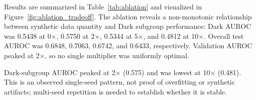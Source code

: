 Results are summarized in Table~\ref{tab:ablation} and visualized in Figure~\ref{fig:ablation_tradeoff}. The ablation reveals a non-monotonic relationship between synthetic data quantity and Dark subgroup performance: Dark AUROC was 0.5438 at 0$\times$, 0.5750 at 2$\times$, 0.5344 at 5$\times$, and 0.4812 at 10$\times$. Overall test AUROC was 0.6848, 0.7063, 0.6742, and 0.6433, respectively. Validation AUROC peaked at 2$\times$, so no single multiplier was uniformly optimal.

Dark-subgroup AUROC peaked at 2$\times$ (0.575) and was lowest at 10$\times$ (0.481). This is an observed single-seed pattern, not proof of overfitting or synthetic artifacts; multi-seed repetition is needed to establish whether it is stable.
